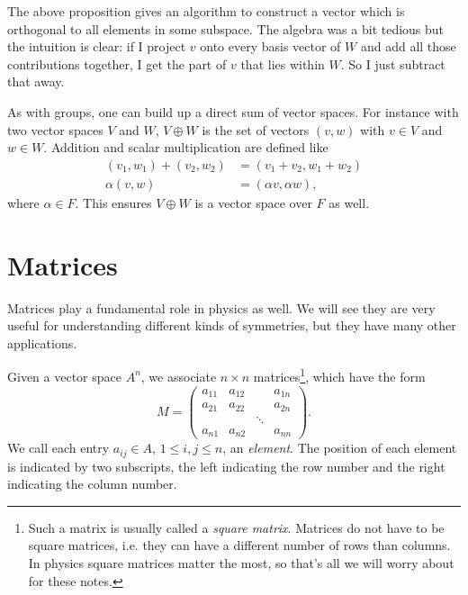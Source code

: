 The above proposition gives an algorithm to construct
a vector which is orthogonal to all elements in some subspace.
The algebra was a bit tedious but the intuition is clear:
if I project $v$ onto every basis vector of $W$ and add all
those contributions together, I get the part of $v$ that lies
within $W$. So I just subtract that away.

As with groups, one can build up a direct sum
of vector spaces. For instance with two vector spaces $V$ and $W$,
$V\oplus W$ is the set of vectors $(v,w)$ with $v\in V$ and $w\in W$.
Addition and scalar multiplication are defined like
\begin{equation}\begin{aligned}
(v_1,w_1)+(v_2,w_2)&=(v_1+v_2,w_1+w_2)\\
\alpha(v,w)&=(\alpha v,\alpha w),
\end{aligned}\end{equation}
where $\alpha\in F$. This ensures $V\oplus W$ is a vector space
over $F$ as well.

\section{Matrices}

Matrices play a fundamental role in physics as well.
We will see they are very useful for understanding different kinds of
symmetries, but they have many other applications.

Given a vector space $A^n$, we associate
$n\times n$ matrices\footnote{Such a matrix is usually called a {\it square
matrix}. Matrices do not have to be square matrices, i.e. they can have a
different number of rows than columns. In physics square
matrices matter the most, so that's all we will worry about for these notes.},
which have the form
\begin{equation}\label{eq:basicMatrix}
  M=\left(\begin{array}{cccc}
          a_{11}   & a_{12} &       & a_{1n}\\
          a_{21}   & a_{22} &       & a_{2n}\\
                   &        & \ddots&       \\
          a_{n1}   & a_{n2} &       & a_{nn}
            \end{array}\right). 
\end{equation}
We call each entry $a_{ij}\in A$, $1\leq i,j\leq n$, an {\it element}. The position
of each element is indicated by two subscripts, the left
indicating the row number and the right indicating the column number.


